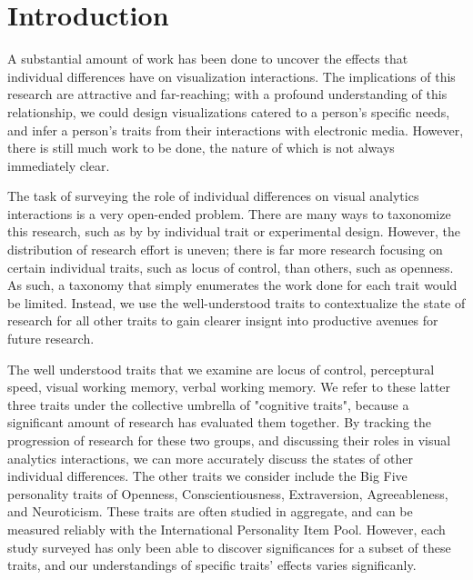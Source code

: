 \documentclass[conference]{IEEEtran}
\begin{document}
\section{Introduction}\label{Intro}
A substantial amount of work has been done to uncover the
effects that individual differences have on visualization
interactions. The implications of this research are attractive
and far-reaching; with a profound understanding of this
relationship, we could design visualizations catered to a
person’s specific needs, and infer a person’s traits from
their interactions with electronic media.  However, there is
still much work to be done, the nature of which is not always
immediately clear.

The task of surveying the role of individual differences on
visual analytics interactions is a very open-ended problem.
There are many ways to taxonomize this research, such as by
by individual trait or experimental design. However, the
distribution of research effort is uneven; there is
far more research focusing on certain individual traits,
such as locus of control, than others, such as openness.
As such, a taxonomy that simply enumerates the work done
for each trait would be limited. Instead, we use the
well-understood traits to contextualize the
state of research for all other traits
to gain clearer insignt into productive avenues for future
research.

The well understood traits that we examine are locus of control,
perceptural speed, visual working memory, verbal working
memory. We refer to these latter three traits under the
collective umbrella of "cognitive traits", because a significant
amount of research has evaluated them together. By tracking
the progression of research for these two groups, and discussing
their roles in visual analytics interactions, we can more
accurately discuss the states of other individual differences. 
The other traits we consider include the Big Five personality traits
of Openness, Conscientiousness, Extraversion, Agreeableness,
and Neuroticism. These traits are often studied in aggregate, and
can be measured reliably with the International Personality Item Pool.
However, each study surveyed has only been able to discover significances
for a subset of these traits, and our understandings of specific traits'
effects varies significanly.
\end{document}
